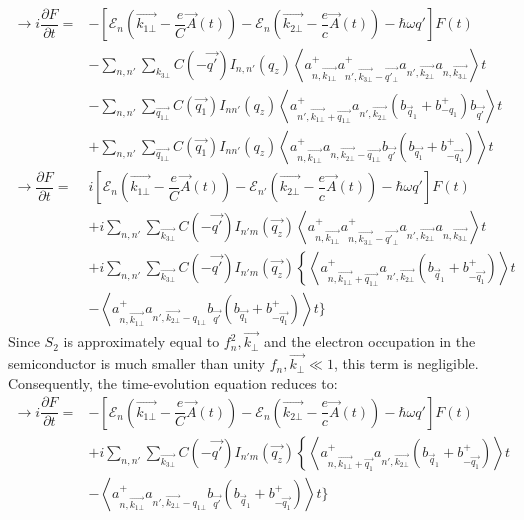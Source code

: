 \documentclass{article}
\begin{document}
\begin{align*}
    \rightarrow i \dfrac{\partial F}{\partial t} = & - \left[\mathcal{E}_{n} \left(\vec{k_{1\bot}} - \dfrac{e}{C} \vec{A} (t) \right) - \mathcal{E}_{n} \left(\vec{k_{2\bot}}-\dfrac{e}{c} \vec{A}(t) \right)- \hbar \omega q'\right] F(t) \\
     & - \sum_{n,n'} \sum_{k_{3\bot}} C \left(- \vec{q'}\right) I _{n,n'} \left(q_z\right) \left \langle a^+_{n, \vec{k_{1\bot}}} a^+_{n', \vec{k_{3\bot}} - \vec{q'_{\bot}}}a_{n', \vec{k_{2\bot}}} a_{n, \vec{k_{3\bot}}}\right \rangle t \\
    & - \sum_{n,n'} \sum_{\vec{q_{1\bot}}} C \left(\vec{q_1}\right) I_{n n'} \left(q_z \right) \left \langle a^+_{n', \vec{k_{1\bot}} + \vec{q_{1\bot}}} a_{n', \vec{k_{2\bot}}}\left(b_{\vec{q}_{1}}+ b^+_{-q_1}\right) b_{\vec{q'}}\right \rangle t \\
    & + \sum_{n,n'} \sum_{\vec{q_{1\bot}}} C \left(\vec{q_1} \right) I_{nn'} \left(q_z\right) \left \langle a^+_{n, \vec{k_{1\bot}}} a_{n, \vec{k_{2\bot}} - \vec{q_{1\bot}}} b_{\vec{q'}} \left(b_{\vec{q_1}}+b^+_{- \vec{q_1}}\right) \right \rangle t \\
   \rightarrow \dfrac{\partial F}{\partial t} = & i \left[\mathcal{E}_{n} \left(\vec{k_{1\bot}} - \dfrac{e}{C} \vec{A} (t) \right) - \mathcal{E}_{n'} \left(\vec{k_{2\bot}}-\dfrac{e}{c} \vec{A}(t) \right)- \hbar \omega q'\right] F(t) \\
   & + i \sum_{n,n'} \sum_{\vec{k_{3\bot}}} C \left(-\vec{q'}\right) I_{n'm} \left(\vec{q_z}\right) \left\langle a^+_{n, \vec{k_{1\bot}}}a^+_{n, \vec{k_{3\bot}} - \vec{q'_{\bot}}}a_{n', \vec{k_{2\bot}}} a_{n, \vec{k_{3\bot}}}\right\rangle t \\
   & + i \sum_{n,n'} \sum_{\vec{k_{3\bot}}} C \left(-\vec{q'}\right) I_{n'm}\left(\vec{q_z}\right) \left\{\left\langle a^+_{n, \vec{k_{1\bot}} + \vec{q_{1\bot}}}a_{n', \vec{k_{2\bot}}}\left(b_{\vec{q}_1}+ b^+_{- \vec{q_1}}\right)\right\rangle t \right. \\
   & -\left \langle a^+_{n, \vec{k_{1\bot}}} a_{n', \vec{k_{2\bot}} - q_{1\bot}}b_{\vec{q'}} \left(b_{\vec{q_1}}+ b^+_{- \vec{q_1}}\right)\right \rangle t\}
\end{align*}
Since $S_2$ is approximately equal to $f^2_n, \vec{k_\bot}$ and the electron occupation in the semiconductor is much smaller than unity $f_n,\vec{k_\bot} \ll 1$, this term is negligible. Consequently, the time-evolution equation reduces to:
\begin{align*}
    \rightarrow i \dfrac{\partial F}{\partial t} = & - \left[\mathcal{E}_{n} \left(\vec{k_{1\bot}} - \dfrac{e}{C} \vec{A} (t) \right) - \mathcal{E}_{n} \left(\vec{k_{2\bot}}-\dfrac{e}{c} \vec{A}(t) \right)- \hbar \omega q'\right] F(t) \\
    & + i \sum_{n,n'} \sum_{\vec{k_{3\bot}}} C \left(-\vec{q'}\right) I_{n'm}\left(\vec{q_z}\right) \left\{\left\langle a^+_{n, \vec{k_{1\bot}} + \vec{q_{1}}} a_{n', \vec{k_{2\bot}}}\left(b_{\vec{q}_1}+ b^+_{- \vec{q_1}}\right)\right\rangle t \right. \\
   & - \left \langle a^+_{n, \vec{k_{1\bot}}} a_{n', \vec{k_{2\bot}}- q_{1\bot}}b_{\vec{q'}} \left(b_{\vec{q}_1}+ b^+_{-\vec{q_1}}\right)\right \rangle t \}
\end{align*}
\end{document}
